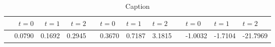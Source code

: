 \begin{table*}\centering
{}
\begin{tabular}{@{}lrrrr@{}}\toprule

& $t=0$ & $t=1$ & $t=2$ && $t=0$ & $t=1$ & $t=2$ && $t=0$ & $t=1$ & $t=2$\\ \midrule
& 0.0790 & 0.1692 & 0.2945 && 0.3670 & 0.7187 & 3.1815 && -1.0032 & -1.7104 & -21.7969\\

\bottomrule
\end{tabular}
\caption{Caption}
\end{table*}